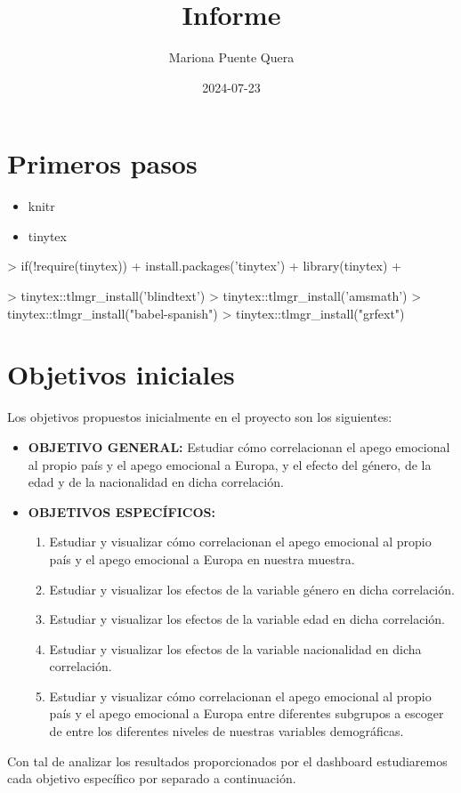 \documentclass{article}
\title{Informe}
\author{Mariona Puente Quera}
\date{2024-07-23}
\begin{document}
\maketitle

\section*{Primeros pasos}
\begin{itemize}
\item knitr
\item tinytex
\end{itemize}
\begin{Schunk}
\begin{Sinput}
> if(!require(tinytex)){
+   install.packages('tinytex')
+   library(tinytex)
+ }
\end{Sinput}
\end{Schunk}

\begin{Schunk}
\begin{Sinput}
> tinytex::tlmgr_install('blindtext')
> tinytex::tlmgr_install('amsmath')
> tinytex::tlmgr_install("babel-spanish")
> tinytex::tlmgr_install("grfext")
\end{Sinput}
\end{Schunk}

\section*{Objetivos iniciales}
Los objetivos propuestos inicialmente en el proyecto son los siguientes:

\begin{itemize}
    \item \textbf{OBJETIVO GENERAL:} Estudiar cómo correlacionan el apego emocional al propio país y el apego emocional a Europa, y el efecto del género, de la edad y de la nacionalidad en dicha correlación.
    \item \textbf{OBJETIVOS ESPECÍFICOS:}
    \begin{enumerate}
        \item Estudiar y visualizar cómo correlacionan el apego emocional al propio país y el apego emocional a Europa en nuestra muestra.
        \item Estudiar y visualizar los efectos de la variable género en dicha correlación.
        \item Estudiar y visualizar los efectos de la variable edad en dicha correlación.
        \item Estudiar y visualizar los efectos de la variable nacionalidad en dicha correlación.
        \item Estudiar y visualizar cómo correlacionan el apego emocional al propio país y el apego emocional a Europa entre diferentes subgrupos a escoger de entre los diferentes niveles de nuestras variables demográficas.
    \end{enumerate}
\end{itemize}
Con tal de analizar los resultados proporcionados por el dashboard estudiaremos cada objetivo específico por separado a continuación.
\end{document}
